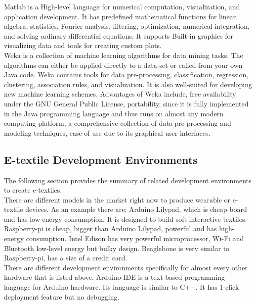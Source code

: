 Matlab is a High-level language for numerical computation, visualization, and application development. It has predefined mathematical functions for linear algebra, statistics, Fourier analysis, filtering, optimization, numerical integration, and solving ordinary differential equations. It supports Built-in graphics for visualizing data and tools for creating custom plots. \\

Weka is a collection of machine learning algorithms for data mining tasks. The algorithms can either be applied directly to a data-set or called from your own Java code. Weka contains tools for data pre-processing, classification, regression, clustering, association rules, and visualization. It is also well-suited for developing new machine learning schemes. Advantages of Weka include, free availability under the GNU General Public License, portability, since it is fully implemented in the Java programming language and thus runs on almost any modern computing platform, a comprehensive collection of data pre-processing and modeling techniques, ease of use due to its graphical user interfaces. \\

\subsection{E-textile Development Environments}

The following section provides the summary of related development environments to create e-textiles. \\ 

	There are different models in the market right now to produce wearable or e-textile devices. As an example there are; Arduino Lilypad, which is cheap board and has low energy consumption. It is designed to build soft interactive textiles. Raspberry-pi is cheap, bigger than Arduino Lilypad, powerful and has high-energy consumption. Intel Edison has very powerful microprocessor, Wi-Fi and Bluetooth low-level energy but bulky design. Beaglebone is very similar to Raspberry-pi, has a size of a credit card. \\


There are different development environments specifically for almost every other hardware that is listed above.  Arduino IDE is a text based programming language for Arduino hardware. Its language is similar to C++. It has 1-click deployment feature but no debugging.  \\

